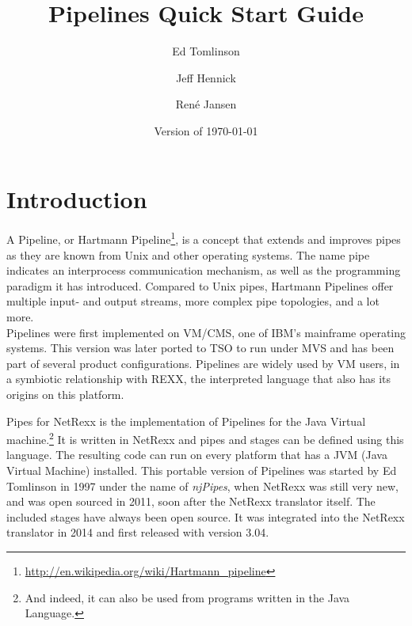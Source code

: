 

\renewcommand{\isbn}{978-90-819090-3-7}    
\setcounter{tocdepth}{1} 
\title{Pipelines Quick Start Guide}
\author{Ed Tomlinson \and Jeff Hennick \and René Jansen}
\date{Version  of \today}
\maketitle
{}
\pagestyle{plain}
\frontmatter
{}
\pagestyle{plain}

\tableofcontents
\newpage
{}
\frontmatter
\large


\mainmatter
\chapter{Introduction}
A Pipeline, or Hartmann Pipeline\footnote{\url{http://en.wikipedia.org/wiki/Hartmann_pipeline}}, is a concept that extends and improves pipes as they are known from Unix and other operating systems. The name pipe indicates an interprocess communication mechanism, as well as the programming paradigm it has introduced. Compared to Unix pipes, Hartmann Pipelines offer multiple input- and output streams, more complex pipe topologies, and a lot more.\\

Pipelines were first implemented on VM/CMS, one of IBM's mainframe
operating systems. This version was later ported to TSO to run under
MVS and has been part of several product configurations. Pipelines are
widely used by VM users, in a symbiotic relationship with REXX, the
interpreted language that also has its origins on this platform.

Pipes for NetRexx is the implementation of Pipelines for the Java Virtual
machine.\footnote{And indeed, it can also be used from programs written
  in the Java Language.} It is written in NetRexx and pipes and stages can be defined using this
language. The resulting code can run on every platform that has a JVM
(Java Virtual Machine) installed. This portable version of Pipelines was started
by Ed Tomlinson in 1997 under the name of \emph{njPipes}, when NetRexx was
still very new, and was open sourced in 2011, soon after the NetRexx
translator itself. The included stages have always been open source. It was integrated into the NetRexx translator in
2014 and first released with version 3.04.

